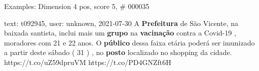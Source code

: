 \begin{frame}{Examples: Dimension 4 pos, score 5, \# 000035}
\footnotesize
\begin{exampleblock}{text: t092945, user: unknown, 2021-07-30}
A \textbf{Prefeitura} de São Vicente, na baixada santista, inclui mais um 
\textbf{grupo} na \textbf{vacinação} contra a Covid-19 , moradores com 21 e 22 
anos. O \textbf{público} dessa faixa etária poderá ser imunizado a partir deste 
sábado ( 31 ) , no \textbf{posto} localizado no shopping da cidade. 
https://t.co/uZ59dpruVM https://t.co/PD4GNZft6H 
\end{exampleblock}
\end{frame}
